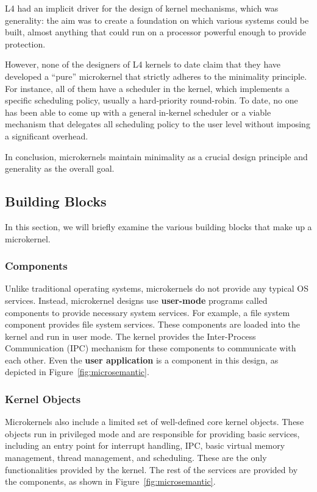 \documentclass[
	a4paper, %
	11pt, %
	unnumberedsections, %
	twoside, %
]{LTJournalArticle}
\begin{document}
L4 had an implicit driver for the design of kernel mechanisms, which was generality: the aim was to create a foundation on which various systems could be built, almost anything that could run on a processor powerful enough to provide protection.

However, none of the designers of L4 kernels to date claim that they have developed a ``pure'' microkernel that strictly adheres to the minimality principle. For instance, all of them have a scheduler in the kernel, which implements a specific scheduling policy, usually a hard-priority round-robin. To date, no one has been able to come up with a general in-kernel scheduler or a viable mechanism that delegates all scheduling policy to the user level without imposing a significant overhead.

In conclusion, microkernels maintain minimality as a crucial design principle and generality as the overall goal.~\cite{Heiser:2016}

\subsection{Building Blocks}

In this section, we will briefly examine the various building blocks that make up a microkernel.

\subsubsection{Components}

Unlike traditional operating systems, microkernels do not provide any typical OS services. Instead, microkernel designs use \textbf{user-mode} programs called components to provide necessary system services. For example, a file system component provides file system services. These components are loaded into the kernel and run in user mode. The kernel provides the Inter-Process Communication (IPC) mechanism for these components to communicate with each other. Even the \textbf{user application} is a component in this design, as depicted in Figure~\ref{fig:microsemantic}.

\subsubsection{Kernel Objects}

Microkernels also include a limited set of well-defined core kernel objects. These objects run in privileged mode and are responsible for providing basic services, including an entry point for interrupt handling, IPC, basic virtual memory management, thread management, and scheduling. These are the only functionalities provided by the kernel. The rest of the services are provided by the components, as shown in Figure~\ref{fig:microsemantic}.
\end{document}
